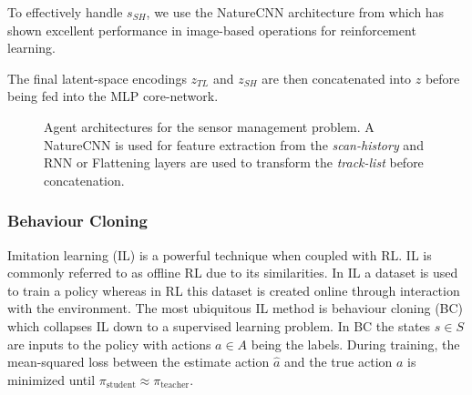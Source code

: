 To effectively handle $s_{SH}$, we use the NatureCNN architecture from \cite{Mnih2015} which has shown excellent performance in image-based operations for reinforcement learning. 

The final latent-space encodings $z_{TL}$ and $z_{SH}$ are then concatenated into $z$ before being fed into the MLP core-network. 

\begin{figure*}[tb!]
    \centering
    \hfill
    \hfill
    \caption{Agent architectures for the sensor management problem. A NatureCNN is used for feature extraction from the \textit{scan-history} and RNN or Flattening layers are used to transform the \textit{track-list} before concatenation.}
    \label{fig:enter-label}
\end{figure*}

\subsubsection{Behaviour Cloning}
\label{sect:behaviour_cloning}

Imitation learning (IL) is a powerful technique when coupled with RL. IL is commonly referred to as offline RL due to its similarities. In IL a dataset is used to train a policy whereas in RL this dataset is created online through interaction with the environment. The most ubiquitous IL method is behaviour cloning (BC) \cite{Foster2024} which collapses IL down to a supervised learning problem. In BC the states $s \in S$ are inputs to the policy with actions $a \in A$ being the labels. During training, the mean-squared loss between the estimate action $\hat a$ and the true action $a$ is minimized until $\pi_\mathrm{student} \approx \pi_\mathrm{teacher}$.

